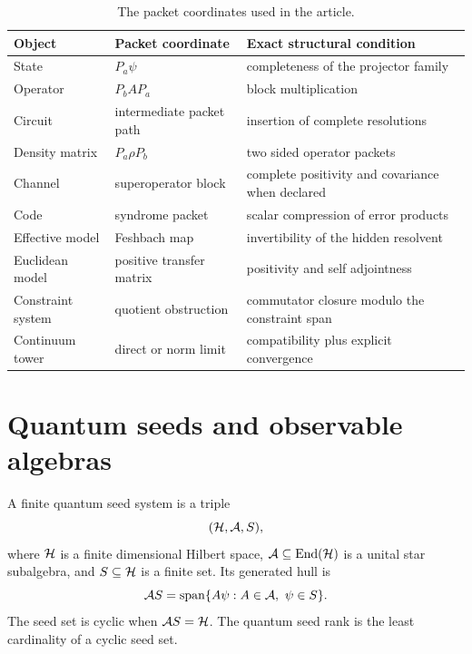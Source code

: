 \begin{table}[t]
\centering
\small
\begin{tabular}{>{\raggedright\arraybackslash}p{}>{\raggedright\arraybackslash}p{}>{\raggedright\arraybackslash}p{}}
\toprule
Object & Packet coordinate & Exact structural condition \\
\midrule
State & \(P_a\psi\) & completeness of the projector family \\
Operator & \(P_bAP_a\) & block multiplication \\
Circuit & intermediate packet path & insertion of complete resolutions \\
Density matrix & \(P_a\rho P_b\) & two sided operator packets \\
Channel & superoperator block & complete positivity and covariance when declared \\
Code & syndrome packet & scalar compression of error products \\
Effective model & Feshbach map & invertibility of the hidden resolvent \\
Euclidean model & positive transfer matrix & positivity and self adjointness \\
Constraint system & quotient obstruction & commutator closure modulo the constraint span \\
Continuum tower & direct or norm limit & compatibility plus explicit convergence \\
\bottomrule
\end{tabular}
\caption{The packet coordinates used in the article.}
\label{strong:tab:dictionary}
\end{table}

\section{Quantum seeds and observable algebras}\label{strong:section:002}\label{strong:sec:seeds}

\begin{definition}\label{strong:definition:001}\label{strong:def:quantum_seed}
A finite quantum seed system is a triple
\[
(\mathcal H,\mathcal A,S),
\]
where \(\mathcal H\) is a finite dimensional Hilbert space, \(\mathcal A\subseteq\operatorname{End}(\mathcal H)\) is a unital star subalgebra, and \(S\subseteq\mathcal H\) is a finite set. Its generated hull is
\[
\mathcal A S
=
\operatorname{span}\{A\psi:A\in\mathcal A,\ \psi\in S\}.
\]
The seed set is cyclic when \(\mathcal A S=\mathcal H\). The quantum seed rank is the least cardinality of a cyclic seed set.
\end{definition}

